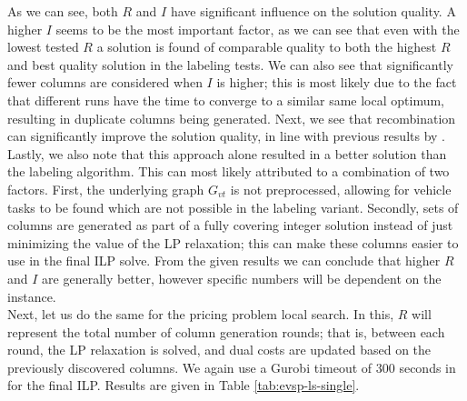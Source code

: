 \documentclass[]{article}
\begin{document}
As we can see, both $R$ and $I$ have significant influence on the solution quality. A higher $I$ seems to be the most important factor, as we can see that even with the lowest tested $R$ a solution is found of comparable quality to both the highest $R$ and best quality solution in the labeling tests. We can also see that significantly fewer columns are considered when $I$ is higher; this is most likely due to the fact that different runs have the time to converge to a similar same local optimum, resulting in duplicate columns being generated. Next, we see that recombination can significantly improve the solution quality, in line with previous results by \citet{Bosch21}. Lastly, we also note that this approach alone resulted in a better solution than the labeling algorithm. This can most likely attributed to a combination of two factors. First, the underlying graph $G_{vt}$ is not preprocessed, allowing for vehicle tasks to be found which are not possible in the labeling variant. Secondly, sets of columns are generated as part of a fully covering integer solution instead of just minimizing the value of the LP relaxation; this can make these columns easier to use in the final ILP solve. From the given results we can conclude that higher $R$ and $I$ are generally better, however specific numbers will be dependent on the instance.  \\

Next, let us do the same for the pricing problem local search. In this, $R$ will represent the total number of column generation rounds; that is, between each round, the LP relaxation is solved, and dual costs are updated based on the previously discovered columns. We again use a Gurobi timeout of 300 seconds in for the final ILP. Results are given in Table \ref{tab:evsp-ls-single}.
\end{document}
